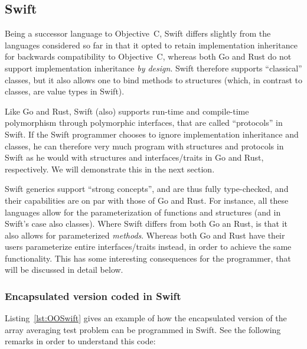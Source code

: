 \documentclass[11pt,oneside]{article}
\begin{document}


\subsection{Swift}

Being a successor language to Objective~C, Swift differs slightly from
the languages considered so far in that it opted to retain
implementation inheritance for backwards compatibility to Objective~C,
whereas both Go and Rust do not support implementation inheritance
\emph{by design}. Swift therefore supports ``classical'' classes, but
it also allows one to bind methods to structures (which, in contrast to
classes, are value types in Swift).

Like Go and Rust, Swift (also) supports run-time and compile-time
polymorphism through polymorphic interfaces, that are called
``protocols'' in Swift. If the Swift programmer chooses to ignore
implementation inheritance and classes, he can therefore very much
program with structures and protocols in Swift as he would with
structures and interfaces/traits in Go and Rust, respectively. We will
demonstrate this in the next section.

Swift generics support ``strong concepts'', and are thus fully
type-checked, and their capabilities are on par with those of Go and
Rust. For instance, all these languages allow for the parameterization
of functions and structures (and in Swift's case also classes). Where
Swift differs from both Go an Rust, is that it also allows for
parameterized \emph{methods}. Whereas both Go and Rust have their
users parameterize entire interfaces/traits instead, in order to
achieve the same functionality. This has some interesting consequences
for the programmer, that will be discussed in detail below.

\subsubsection{Encapsulated version coded in Swift}

Listing~\ref{lst:OOSwift} gives an example of how the encapsulated
version of the array averaging test problem can be programmed in
Swift. See the following remarks in order to understand this code:
\end{document}
